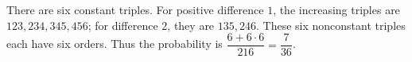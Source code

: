 There are six constant triples. For positive difference $1$, the increasing triples are $123,234,345,456$; for difference $2$, they are $135,246$. These six nonconstant triples each have six orders. Thus the probability is $\dfrac{6+6\cdot6}{216}=\boxed{\dfrac{7}{36}}$.
